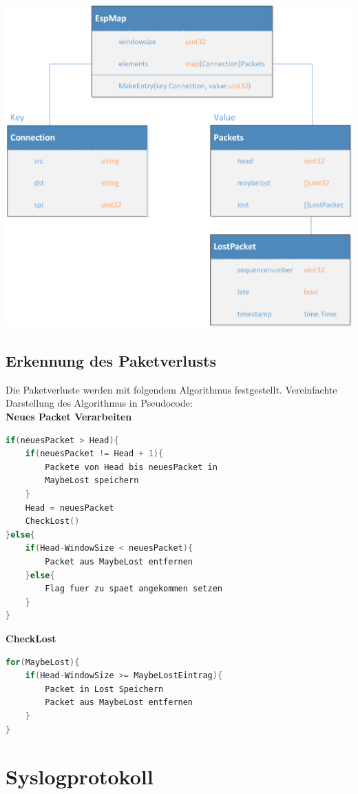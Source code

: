 \includegraphics[width=1\textwidth]{start/img/Datenstruktur.png}

\subsection{Erkennung des Paketverlusts}
Die Paketverluste werden mit folgendem Algorithmus festgestellt.
Vereinfachte Darstellung des Algorithmus in Pseudocode:
\\
\textbf{Neues Packet Verarbeiten}
\begin{lstlisting}[language=go]
if(neuesPacket > Head){
	if(neuesPacket != Head + 1){
		Packete von Head bis neuesPacket in 
		MaybeLost speichern
	}
	Head = neuesPacket
	CheckLost()
}else{
	if(Head-WindowSize < neuesPacket){
		Packet aus MaybeLost entfernen
	}else{
		Flag fuer zu spaet angekommen setzen	
	}
}
\end{lstlisting}

\textbf{CheckLost}
\begin{lstlisting}[language=go]
for(MaybeLost){
	if(Head-WindowSize >= MaybeLostEintrag){
		Packet in Lost Speichern
		Packet aus MaybeLost entfernen
	}
}
\end{lstlisting}


\section{Syslogprotokoll}
\label{sec:Syslogprotokoll}

